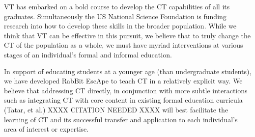 \documentclass{acm_proc_article-sp}
\begin{document}
VT has embarked on a bold course to develop the CT capabilities of all its graduates.
Simultaneously the US National Science Foundation is funding research into how to develop these skills in the broader population.
While we think that VT can be effective in this pursuit, we believe that to truly change the CT of the population as a whole, we must have myriad interventions at various stages of an individual's formal and informal education.

In support of educating students at a younger age (than undergraduate students), we have developed RabBit EscApe to teach CT in a relatively explicit way.
We believe that addressing CT directly, in conjunction with more subtle interactions such as integrating CT with core content in existing formal education curricula (Tatar, et al.) XXXX CITATION NEEDED XXXX\cite{NEEDED} will best facilitate the learning of CT and its successful transfer and application to each individual's area of interest or expertise.
\end{document}
